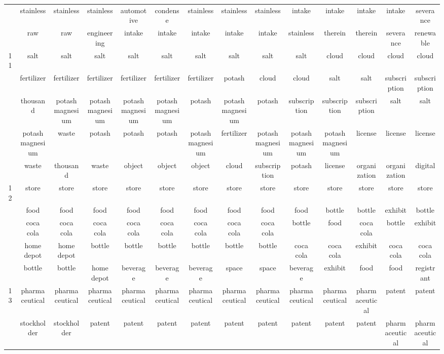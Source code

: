 \documentclass[12pt,journal,letterpaper,oneside,onecolumn]{IEEEtran}
\begin{document}
\begin{center}
{\begin{tabular}{c|c|c|c|c|c|c|c|c|c|c|c|c|c}
         & stainless & stainless & stainless & automotive & condense & stainless & stainless & stainless & intake & intake & intake & intake & severance \\ 
         & raw & raw & engineering & intake & intake & intake & intake & intake & stainless & therein & therein & severance & renewable \\ 
        \hline
        11 & salt & salt & salt & salt & salt & salt & salt & salt & salt & cloud & cloud & cloud & cloud \\ 
         & fertilizer & fertilizer & fertilizer & fertilizer & fertilizer & fertilizer & potash & cloud & cloud & salt & salt & subscription & subscription \\ 
         & thousand & potash magnesium & potash magnesium & potash magnesium & potash magnesium & potash & potash magnesium & potash & subscription & subscription & subscription & salt & salt \\ 
         & potash magnesium & waste & potash & potash & potash & potash magnesium & fertilizer & potash magnesium & potash magnesium & potash magnesium & license & license & license \\ 
         & waste & thousand & waste & object & object & object & cloud & subscription & potash & license & organization & organization & digital \\ 
        \hline
        12 & store & store & store & store & store & store & store & store & store & store & store & store & store \\ 
         & food & food & food & food & food & food & food & food & food & bottle & bottle & exhibit & bottle \\ 
         & coca cola & coca cola & coca cola & coca cola & coca cola & coca cola & coca cola & coca cola & bottle & food & coca cola & bottle & exhibit \\ 
         & home depot & home depot & bottle & bottle & bottle & bottle & bottle & bottle & coca cola & coca cola & exhibit & coca cola & coca cola \\ 
         & bottle & bottle & home depot & beverage & beverage & beverage & space & space & beverage & exhibit & food & food & registrant \\ 
        \hline
        13 & pharmaceutical & pharmaceutical & pharmaceutical & pharmaceutical & pharmaceutical & pharmaceutical & pharmaceutical & pharmaceutical & pharmaceutical & pharmaceutical & pharmaceutical & patent & patent \\ 
         & stockholder & stockholder & patent & patent & patent & patent & patent & patent & patent & patent & patent & pharmaceutical & pharmaceutical \\ 

\end{tabular}}
\end{center}
\end{document}
